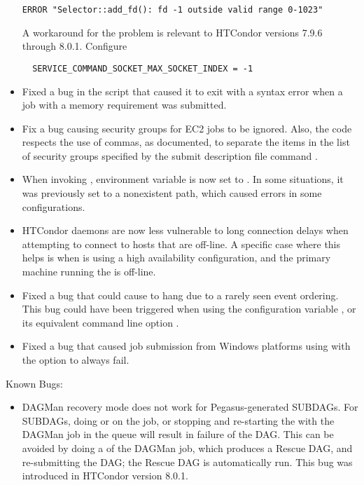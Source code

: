 \begin{itemize}
\begin{verbatim}
ERROR "Selector::add_fd(): fd -1 outside valid range 0-1023"
\end{verbatim}

A workaround for the problem is relevant to HTCondor versions 7.9.6 through
8.0.1. Configure
\begin{verbatim}
  SERVICE_COMMAND_SOCKET_MAX_SOCKET_INDEX = -1
\end{verbatim}

\item Fixed a bug in the  script that caused it to exit
with a syntax error when a job with a memory requirement was
submitted.

\item Fix a bug causing security groups for EC2 jobs to be ignored.  
Also, the code respects the use of commas, as documented, 
to separate the items in the list of security groups specified by
the submit description file command . 

\item When invoking , environment variable
 is now set to .  
In some situations, it was previously set
to a nonexistent path, which caused errors in some configurations.

\item HTCondor daemons are now less vulnerable to long connection delays
when attempting to connect to hosts that are off-line.  A specific case
where this helps is when  is using a high availability
configuration, and the primary machine running the  
is off-line.

\item Fixed a bug that could cause  to hang 
due to a rarely seen event ordering.
This bug could have been triggered when using the
configuration variable ,
or its equivalent command line option .

\item Fixed a bug that caused job submission from Windows platforms
using  with the  option to always fail.

\end{itemize}

\noindent Known Bugs:

\begin{itemize}

\item DAGMan recovery mode does not work for Pegasus-generated SUBDAGs.
For SUBDAGs, doing  or  on
the  job, or stopping and re-starting the 
 with the DAGMan
job in the queue will result in failure of the DAG.  This can be
avoided by doing a  of the DAGMan job, which produces a Rescue
DAG, and re-submitting the DAG; the Rescue DAG is automatically run.
This bug was introduced in HTCondor version 8.0.1.

\end{itemize}


